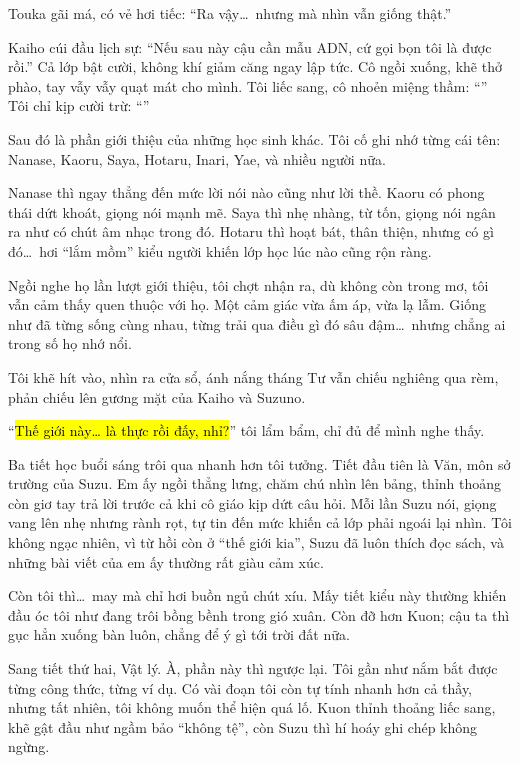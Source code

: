 \documentclass[../main.tex]{subfiles}
\begin{document}
Touka gãi má, có vẻ hơi tiếc: ``Ra vậy\dots\ nhưng mà nhìn vẫn giống thật.''

Kaiho cúi đầu lịch sự: ``Nếu sau này cậu cần mẫu ADN, cứ gọi bọn tôi là được rồi.'' Cả lớp bật cười, không khí giảm căng ngay lập tức. Cô ngồi xuống, khẽ thở phào, tay vẫy vẫy quạt mát cho mình. Tôi liếc sang, cô nhoẻn miệng thầm: ``'' Tôi chỉ kịp cười trừ: ``''

Sau đó là phần giới thiệu của những học sinh khác. Tôi cố ghi nhớ từng cái tên: Nanase, Kaoru, Saya, Hotaru, Inari, Yae, và nhiều người nữa.

Nanase thì ngay thẳng đến mức lời nói nào cũng như lời thề. Kaoru có phong thái dứt khoát, giọng nói mạnh mẽ. Saya thì nhẹ nhàng, từ tốn, giọng nói ngân ra như có chút âm nhạc trong đó. Hotaru thì hoạt bát, thân thiện, nhưng có gì đó\dots\ hơi ``lắm mồm'' kiểu người khiến lớp học lúc nào cũng rộn ràng.

Ngồi nghe họ lần lượt giới thiệu, tôi chợt nhận ra, dù không còn trong mơ, tôi vẫn cảm thấy quen thuộc với họ. Một cảm giác vừa ấm áp, vừa lạ lẫm. Giống như đã từng sống cùng nhau, từng trải qua điều gì đó sâu đậm\dots\ nhưng chẳng ai trong số họ nhớ nổi.

Tôi khẽ hít vào, nhìn ra cửa sổ, ánh nắng tháng Tư vẫn chiếu nghiêng qua rèm, phản chiếu lên gương mặt của Kaiho và Suzuno.

``\hl{Thế giới này\dots{} là thực rồi đấy, nhỉ?}'' tôi lẩm bẩm, chỉ đủ để mình nghe thấy.


Ba tiết học buổi sáng trôi qua nhanh hơn tôi tưởng. Tiết đầu tiên là Văn, môn sở trường của Suzu. Em ấy ngồi thẳng lưng, chăm chú nhìn lên bảng, thỉnh thoảng còn giơ tay trả lời trước cả khi cô giáo kịp dứt câu hỏi. Mỗi lần Suzu nói, giọng vang lên nhẹ nhưng rành rọt, tự tin đến mức khiến cả lớp phải ngoái lại nhìn. Tôi không ngạc nhiên, vì từ hồi còn ở ``thế giới kia'', Suzu đã luôn thích đọc sách, và những bài viết của em ấy thường rất giàu cảm xúc.

Còn tôi thì\dots\ may mà chỉ hơi buồn ngủ chút xíu. Mấy tiết kiểu này thường khiến đầu óc tôi như đang trôi bồng bềnh trong gió xuân. Còn đỡ hơn Kuon; cậu ta thì gục hẳn xuống bàn luôn, chẳng để ý gì tới trời đất nữa.

Sang tiết thứ hai, Vật lý. À, phần này thì ngược lại. Tôi gần như nắm bắt được từng công thức, từng ví dụ. Có vài đoạn tôi còn tự tính nhanh hơn cả thầy, nhưng tất nhiên, tôi không muốn thể hiện quá lố. Kuon thỉnh thoảng liếc sang, khẽ gật đầu như ngầm bảo ``không tệ'', còn Suzu thì hí hoáy ghi chép không ngừng.
\end{document}
